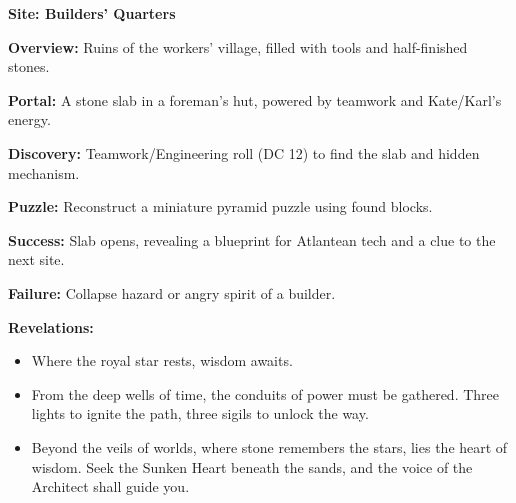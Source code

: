\documentclass[12pt]{article}
\begin{document}
\textbf{Site: Builders' Quarters}

\textbf{Overview:}  
Ruins of the workers' village, filled with tools and half-finished stones.

\textbf{Portal:}  
A stone slab in a foreman's hut, powered by teamwork and Kate/Karl's energy.

\textbf{Discovery:}  
Teamwork/Engineering roll (DC 12) to find the slab and hidden mechanism.

\textbf{Puzzle:}  
Reconstruct a miniature pyramid puzzle using found blocks.

\textbf{Success:}  
Slab opens, revealing a blueprint for Atlantean tech and a clue to the next site.

\textbf{Failure:}  
Collapse hazard or angry spirit of a builder.

\textbf{Revelations:}
\begin{itemize}
  \item Where the royal star rests, wisdom awaits.
  \item From the deep wells of time, the conduits of power must be gathered. Three lights to ignite the path, three sigils to unlock the way.
  \item Beyond the veils of worlds, where stone remembers the stars, lies the heart of wisdom. Seek the Sunken Heart beneath the sands, and the voice of the Architect shall guide you.
\end{itemize}
\end{document}
